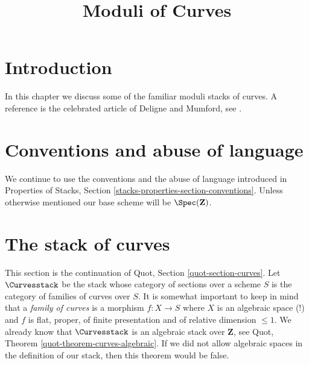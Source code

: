 

%


\title{Moduli of Curves}

\maketitle

\label{section-phantom}

\tableofcontents




\section{Introduction}
\label{section-introduction}

\noindent
In this chapter we discuss some of the familiar moduli stacks of curves.
A reference is the celebrated article of Deligne and Mumford, see \cite{DM}.




\section{Conventions and abuse of language}
\label{section-conventions}

\noindent
We continue to use the conventions and the abuse of language
introduced in
Properties of Stacks, Section \ref{stacks-properties-section-conventions}.
Unless otherwise mentioned our base scheme will be $\Spec(\mathbf{Z})$.







\section{The stack of curves}
\label{section-stack-curves}

\noindent
This section is the continuation of Quot, Section \ref{quot-section-curves}.
Let $\Curvesstack$ be the stack whose category of sections over a
scheme $S$ is the category of families of curves over $S$.
It is somewhat important to keep in mind that a
{\it family of curves} is a morphism $f : X \to S$ where $X$
is an algebraic space (!) and $f$ is flat, proper, of finite presentation
and of relative dimension $\leq 1$.
We already know that $\Curvesstack$ is an
algebraic stack over $\mathbf{Z}$, see Quot, Theorem
\ref{quot-theorem-curves-algebraic}.
If we did not allow algebraic spaces in the definition of
our stack, then this theorem would be false.

